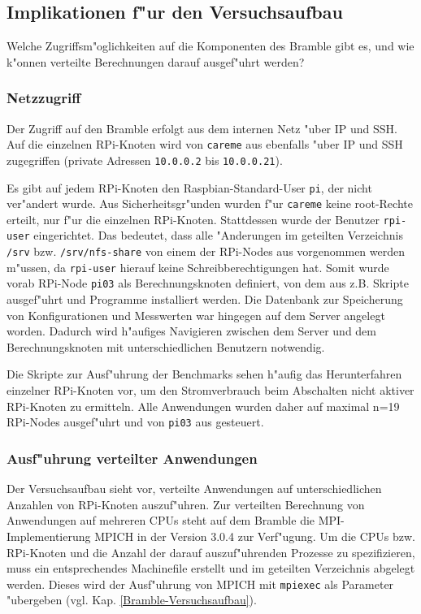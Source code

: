 \subsection{Implikationen f"ur den Versuchsaufbau}\label{Versuchsaufbau}

Welche Zugriffsm"oglichkeiten auf die Komponenten des Bramble gibt es, und wie k"onnen verteilte Berechnungen darauf ausgef"uhrt werden? 

\subsubsection{Netzzugriff}

Der Zugriff auf den Bramble erfolgt aus dem internen Netz "uber IP und SSH. Auf die einzelnen RPi-Knoten wird von \texttt{careme} aus ebenfalls "uber IP und SSH zugegriffen (private Adressen \texttt{10.0.0.2} bis \texttt{10.0.0.21}). 


Es gibt auf jedem RPi-Knoten den Raspbian-Standard-User \texttt{pi}, der nicht ver"andert wurde. Aus Sicherheitsgr"unden wurden f"ur \texttt{careme} keine root-Rechte erteilt, nur f"ur die einzelnen RPi-Knoten. Stattdessen wurde der Benutzer \texttt{rpi-user} eingerichtet. Das bedeutet, dass alle "Anderungen im geteilten Verzeichnis \texttt{/srv} bzw. \texttt{/srv/nfs-share} von einem der RPi-Nodes aus vorgenommen werden m"ussen, da \texttt{rpi-user} hierauf keine Schreibberechtigungen hat. Somit wurde vorab RPi-Node \texttt{pi03} als Berechnungsknoten definiert, von dem aus z.B. Skripte ausgef"uhrt und Programme installiert werden. Die Datenbank zur Speicherung von Konfigurationen und Messwerten war hingegen auf dem Server angelegt worden. Dadurch wird h"aufiges Navigieren zwischen dem Server und dem Berechnungsknoten mit unterschiedlichen Benutzern notwendig.

Die Skripte zur Ausf"uhrung der Benchmarks sehen h"aufig das Herunterfahren einzelner RPi-Knoten vor, um den Stromverbrauch beim Abschalten nicht aktiver RPi-Knoten zu ermitteln. Alle Anwendungen wurden daher auf maximal n=19 RPi-Nodes ausgef"uhrt und von \texttt{pi03} aus gesteuert. 

\subsubsection{Ausf"uhrung verteilter Anwendungen}

Der Versuchsaufbau sieht vor, verteilte Anwendungen auf unterschiedlichen Anzahlen von RPi-Knoten auszuf"uhren. Zur verteilten Berechnung von Anwendungen auf mehreren CPUs steht auf dem Bramble die MPI-Implementierung MPICH in der Version 3.0.4 zur Verf"ugung. Um die CPUs bzw. RPi-Knoten und die Anzahl der darauf auszuf"uhrenden Prozesse zu spezifizieren, muss ein entsprechendes Machinefile erstellt und im geteilten Verzeichnis abgelegt werden. Dieses wird der Ausf"uhrung von MPICH mit \texttt{mpiexec} als Parameter "ubergeben (vgl. Kap. \ref{Bramble-Versuchsaufbau}). 
\endinput 